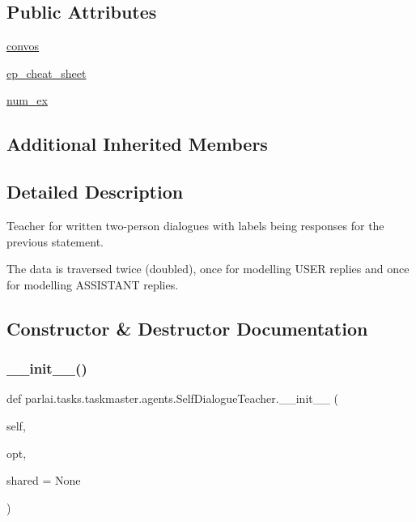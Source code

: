 \subsection*{Public Attributes}
\begin{DoxyCompactItemize}
\item 
\hyperlink{classparlai_1_1tasks_1_1taskmaster_1_1agents_1_1SelfDialogueTeacher_a6a5215f1c64623de6962a32b95f27fac}{convos}
\item 
\hyperlink{classparlai_1_1tasks_1_1taskmaster_1_1agents_1_1SelfDialogueTeacher_ac8110082f9ce0736ff129f93cf7740c1}{ep\+\_\+cheat\+\_\+sheet}
\item 
\hyperlink{classparlai_1_1tasks_1_1taskmaster_1_1agents_1_1SelfDialogueTeacher_a8a3fced952427353aba96b59a8efe0d2}{num\+\_\+ex}
\end{DoxyCompactItemize}
\subsection*{Additional Inherited Members}


\subsection{Detailed Description}
\begin{DoxyVerb}Teacher for written two-person dialogues with labels being responses for the
previous statement.

The data is traversed twice (doubled), once for modelling USER replies and once for
modelling ASSISTANT replies.
\end{DoxyVerb}
 

\subsection{Constructor \& Destructor Documentation}
\mbox{\label{classparlai_1_1tasks_1_1taskmaster_1_1agents_1_1SelfDialogueTeacher_a32491a46f580811d074f1a2566793fc4}} 
\subsubsection{\texorpdfstring{\+\_\+\+\_\+init\+\_\+\+\_\+()}{\_\_init\_\_()}}
{\footnotesize\ttfamily def parlai.\+tasks.\+taskmaster.\+agents.\+Self\+Dialogue\+Teacher.\+\_\+\+\_\+init\+\_\+\+\_\+ (\begin{DoxyParamCaption}\item[{}]{self,  }\item[{}]{opt,  }\item[{}]{shared = {\ttfamily None} }\end{DoxyParamCaption})}



